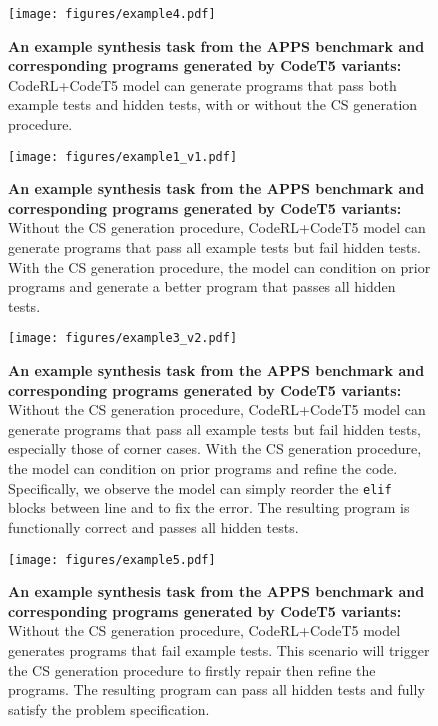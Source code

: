 \documentclass{article}
\begin{document}
\begin{figure}[htbp]
	\centering
	\resizebox{1.0\textwidth}{!} {
	\texttt{[image: figures/example4.pdf]}
	}
	\caption{
	\textbf{An example synthesis task from the APPS benchmark and corresponding programs generated by CodeT5 variants:}
	CodeRL+CodeT5 model can generate programs that pass both example tests and hidden tests, with or without the CS generation procedure. 
	}
	\label{app_fig:example_program4}
\end{figure}

\begin{figure}[htbp]
	\centering
	\resizebox{1.0\textwidth}{!} {
	\texttt{[image: figures/example1\_v1.pdf]}
	}
	\caption{
	\textbf{An example synthesis task from the APPS benchmark and corresponding programs generated by CodeT5 variants:}
	Without the CS generation procedure, CodeRL+CodeT5 model can generate programs that pass all example tests but fail hidden tests. 
	With the CS generation procedure, the model can condition on prior programs and generate a better program that passes all hidden tests. 
	}
	\label{app_fig:example_program1}
\end{figure}

\begin{figure}[htbp]
	\centering
	\resizebox{1.0\textwidth}{!} {
	\texttt{[image: figures/example3\_v2.pdf]}
	}
	\caption{
	\textbf{An example synthesis task from the APPS benchmark and corresponding programs generated by CodeT5 variants:}
	Without the CS generation procedure, CodeRL+CodeT5 model can generate programs that pass all example tests but fail hidden tests, especially those of corner cases. 
	With the CS generation procedure, the model can condition on prior programs and refine the code. 
	Specifically, we observe the model can simply reorder the \texttt{elif} blocks between line  and  to fix the error.
	The resulting program is functionally correct and passes all hidden tests. 
	}
	\label{app_fig:example_program3}
\end{figure}

\begin{figure}[htbp]
	\centering
	\resizebox{1.0\textwidth}{!} {
	\texttt{[image: figures/example5.pdf]}
	}
	\caption{
	\textbf{An example synthesis task from the APPS benchmark and corresponding programs generated by CodeT5 variants:}
	Without the CS generation procedure, CodeRL+CodeT5 model generates programs that fail example tests. 
	This scenario will trigger the CS generation procedure to firstly repair then refine the programs. 
	The resulting program can pass all hidden tests and fully satisfy the problem specification. 
	}
	\label{app_fig:example_program5}
\end{figure}
\end{document}

